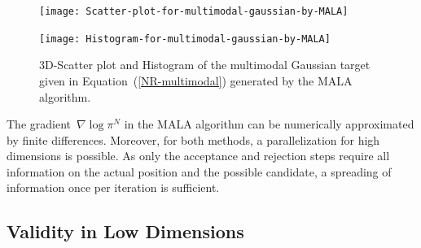\begin{figure}%
\begin{minipage}[c]{0.5\textwidth}
\texttt{[image: Scatter-plot-for-multimodal-gaussian-by-MALA]}
\end{minipage}
\hspace{\fill}
\begin{minipage}[c]{0.5\textwidth}
\texttt{[image: Histogram-for-multimodal-gaussian-by-MALA]}
\end{minipage}

  \caption{3D-Scatter plot and Histogram of the multimodal Gaussian target given in Equation~(\ref{NR-multimodal}) generated by the MALA algorithm.}
  \label{fig:Scatter plot for multimodal gaussian by MALA}
\end{figure}


\begin{rem}
 The gradient~$\nabla \log \pi^{N}$ in the MALA algorithm can be numerically approximated by finite differences. Moreover, for both methods, a parallelization for high dimensions is possible. As only the acceptance and rejection steps require all information on the actual position and the possible candidate, a spreading of information once per iteration is sufficient.
\end{rem}


\subsection{Validity in Low Dimensions}
\label{sub:sec:Numericals Low dimensions}

